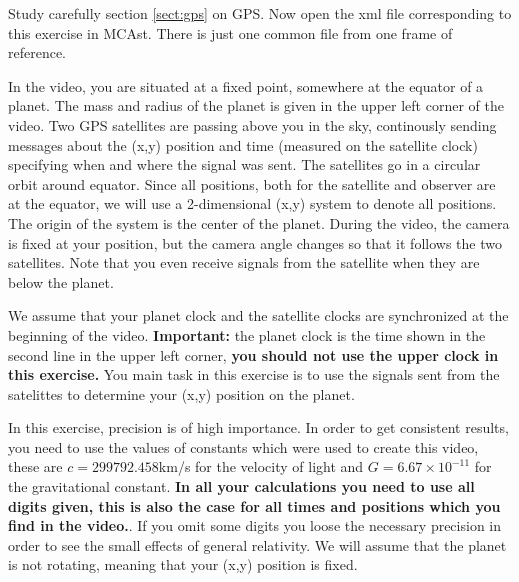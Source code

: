 {\begin{multicols}{2}
Study carefully section \ref{sect:gps} on GPS. Now open the xml file corresponding to this exercise in MCAst. There is just one common file from one frame of reference.

In the video, you are situated at a fixed point, somewhere at the equator of a planet. The mass and radius of the planet is given in the upper left corner of the video. Two GPS satellites are passing above you in the sky, continously sending messages about the (x,y) position and time (measured on the satellite clock) specifying when and where the signal was sent. The satellites go in a circular orbit around equator. Since all positions, both for the satellite and observer are at the equator, we will use a 2-dimensional (x,y) system to denote all positions. The origin of the system is the center of the planet. During the video, the camera is fixed at your position, but the camera angle changes so that it follows the two satellites. Note that you even receive signals from the satellite when they are below the planet.

We assume that your planet clock and the satellite clocks are synchronized at the beginning of the video. {\bf Important:} the planet clock is the time shown in the second line in the upper left corner, {\bf you should not use the upper clock in this exercise.} You main task in this exercise is to use the signals sent from the satelittes to determine your (x,y) position on the planet.

In this exercise, precision is of high importance. In order to get consistent results, you need to use the values of constants which were used to create this video, these are $c = 299792.458$km/s for the velocity of light and $G=6.67\times10^{-11}$ for the gravitational constant. {\bf In all your calculations you need to use all digits given, this is also the case for all times and positions which you find in the video.}. If you omit some digits you loose the necessary precision in order to see the small effects of general relativity. We will assume that the planet is not rotating, meaning that your (x,y) position is fixed.


\end{multicols}}
